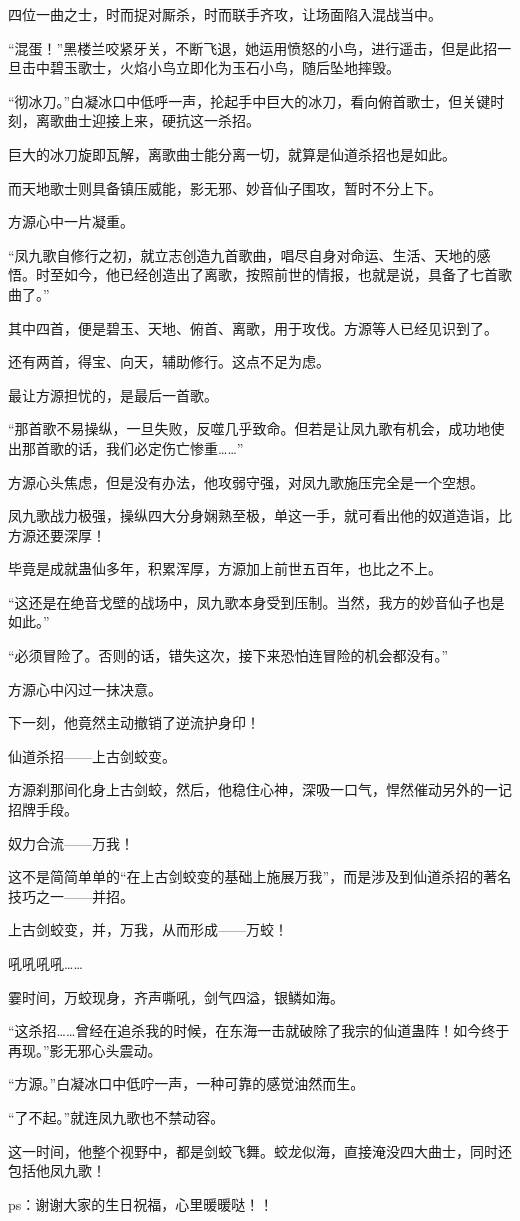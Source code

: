 \begin{this_body}
四位一曲之士，时而捉对厮杀，时而联手齐攻，让场面陷入混战当中。

“混蛋！”黑楼兰咬紧牙关，不断飞退，她运用愤怒的小鸟，进行遥击，但是此招一旦击中碧玉歌士，火焰小鸟立即化为玉石小鸟，随后坠地摔毁。

“彻冰刀。”白凝冰口中低呼一声，抡起手中巨大的冰刀，看向俯首歌士，但关键时刻，离歌曲士迎接上来，硬抗这一杀招。

巨大的冰刀旋即瓦解，离歌曲士能分离一切，就算是仙道杀招也是如此。

而天地歌士则具备镇压威能，影无邪、妙音仙子围攻，暂时不分上下。

方源心中一片凝重。

“凤九歌自修行之初，就立志创造九首歌曲，唱尽自身对命运、生活、天地的感悟。时至如今，他已经创造出了离歌，按照前世的情报，也就是说，具备了七首歌曲了。”

其中四首，便是碧玉、天地、俯首、离歌，用于攻伐。方源等人已经见识到了。

还有两首，得宝、向天，辅助修行。这点不足为虑。

最让方源担忧的，是最后一首歌。

“那首歌不易操纵，一旦失败，反噬几乎致命。但若是让凤九歌有机会，成功地使出那首歌的话，我们必定伤亡惨重……”

方源心头焦虑，但是没有办法，他攻弱守强，对凤九歌施压完全是一个空想。

凤九歌战力极强，操纵四大分身娴熟至极，单这一手，就可看出他的奴道造诣，比方源还要深厚！

毕竟是成就蛊仙多年，积累浑厚，方源加上前世五百年，也比之不上。

“这还是在绝音戈壁的战场中，凤九歌本身受到压制。当然，我方的妙音仙子也是如此。”

“必须冒险了。否则的话，错失这次，接下来恐怕连冒险的机会都没有。”

方源心中闪过一抹决意。

下一刻，他竟然主动撤销了逆流护身印！

仙道杀招——上古剑蛟变。

方源刹那间化身上古剑蛟，然后，他稳住心神，深吸一口气，悍然催动另外的一记招牌手段。

奴力合流——万我！

这不是简简单单的“在上古剑蛟变的基础上施展万我”，而是涉及到仙道杀招的著名技巧之一——并招。

上古剑蛟变，并，万我，从而形成——万蛟！

吼吼吼吼……

霎时间，万蛟现身，齐声嘶吼，剑气四溢，银鳞如海。

“这杀招……曾经在追杀我的时候，在东海一击就破除了我宗的仙道蛊阵！如今终于再现。”影无邪心头震动。

“方源。”白凝冰口中低咛一声，一种可靠的感觉油然而生。

“了不起。”就连凤九歌也不禁动容。

这一时间，他整个视野中，都是剑蛟飞舞。蛟龙似海，直接淹没四大曲士，同时还包括他凤九歌！

ps：谢谢大家的生日祝福，心里暖暖哒！！

\end{this_body}

